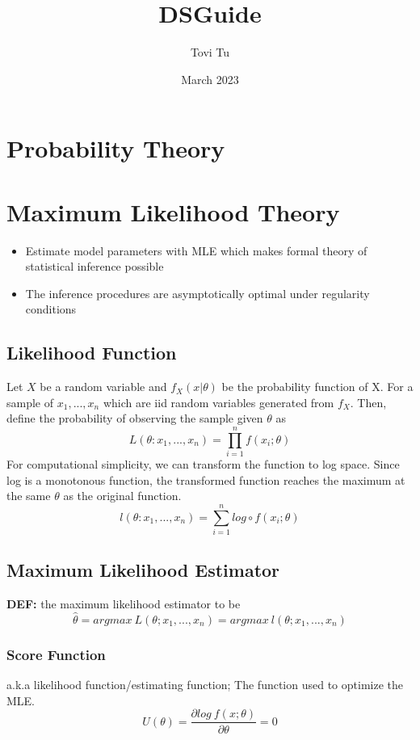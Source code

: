 \documentclass[9pt]{article}
\title{DSGuide}
\author{Tovi Tu}
\date{March 2023}
\newcommand{\de}{\textbf{DEF: }}
\begin{document}
\maketitle

\section{Probability Theory}

\newpage
\section{Maximum Likelihood Theory}
\begin{itemize}
    \item Estimate model parameters with MLE which makes formal theory of statistical inference possible
    \item The inference procedures are asymptotically optimal under regularity conditions
\end{itemize}

\subsection{Likelihood Function}

Let $X$ be a random variable and $f_X(x|\theta)$ be the probability function of X. For a sample of $x_1, ..., x_n$ which are iid random variables generated from $f_X$. Then, define the probability of observing the sample given $\theta$ as 
$$
L(\theta:x_1, ..., x_n) = \prod_{i=1}^{n}f(x_i;\theta)
$$
For computational simplicity, we can transform the function to log space. Since log is a monotonous function, the transformed function reaches the maximum at the same $\theta$ as the original function.
$$
l(\theta:x_1, ..., x_n) = \sum_{i=1}^{n}log\circ f(x_i;\theta)
$$
\subsection{Maximum Likelihood Estimator}

\de the maximum likelihood estimator to be
$$
\hat \theta = argmax\ L(\theta; x_1,...,x_n) = argmax\ l(\theta;x_1, ..., x_n)
$$
\subsubsection{Score Function}

a.k.a likelihood function/estimating function; The function used to optimize the MLE.
$$
U(\theta) =\frac{\partial log\ f(x;\theta)}{\partial \theta} = 0
$$
\end{document}

